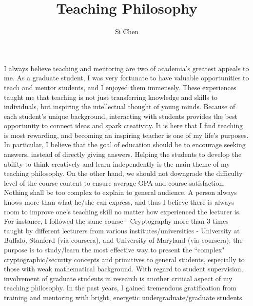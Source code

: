 \documentclass[11pt]{article}
\begin{document}
\title{Teaching Philosophy}
\author{Si Chen}
\date{}
\maketitle


I always believe teaching and mentoring are two of academia's greatest appeals to me. As a graduate student, I was very fortunate to have valuable opportunities to teach and mentor students, and I enjoyed them immensely. These experiences taught me that teaching is not just transferring knowledge and skills to individuals, but inspiring the intellectual thought of young minds. Because of each student's unique background, interacting with students provides the best opportunity to connect ideas and spark creativity. It is here that I find teaching is most rewarding, and becoming an inspiring teacher is one of my life's purposes. In particular, I believe that the goal of education should be to encourage seeking answers, instead of directly giving answers. Helping the students to develop the ability to think creatively and learn independently is the main theme of my teaching philosophy. On the other hand, we should not downgrade the difficulty level of the course content to ensure average GPA and course satisfaction. Nothing shall be too complex to explain to general audience. A person always knows more than what he/she can express, and thus I believe there is always room to improve one's teaching skill no matter how experienced the lecturer is. For instance, I followed the same course - Cryptography more than 3 times taught by different lecturers from various institutes/universities - University at Buffalo, Stanford (via coursera), and University of Maryland (via coursera); the purpose is to study/learn the most effective way to present the ``complex" cryptographic/security concepts and primitives to general students, especially to those with weak mathematical background. With regard to student supervision, involvement of graduate students in research is another critical aspect of my teaching philosophy. In the past years, I gained tremendous gratification from training and mentoring with bright, energetic undergraduate/graduate students. 
\end{document}
